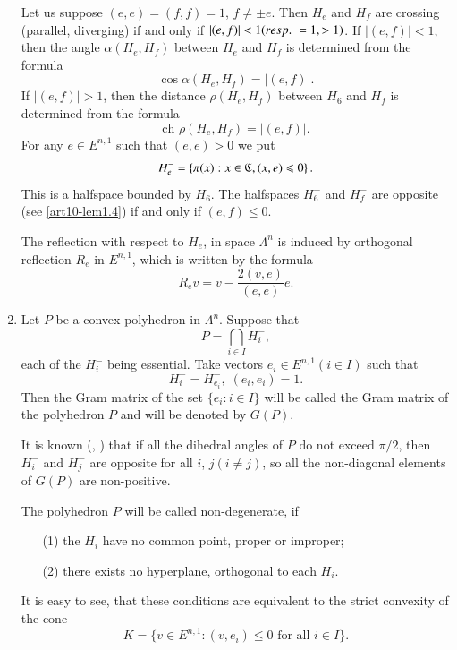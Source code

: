 \begin{enumerate}
Let us suppose $(e,e) = (f,f) = 1$, $f \neq \pm e$. Then $H_e$ and $H_f$ are crossing (\resp parallel, diverging) if and only if $|(e,f)| < 1 ({resp.}\kern.3em = 1, > 1)$. If $|(e,f)| <1$, then the angle $\alpha (H_e, H_f)$ between $H_e$ and $H_f$ is determined from the formula
$$
\cos \alpha (H_e, H_f) = |(e,f)|.
$$
If $|(e,f)| >1$, then the distance $\rho (H_e, H_f)$ between $H_6$ and $H_f$ is determined from the formula
$$
\text{ch } \rho (H_e, H_f) = |(e,f)|.
$$
For any $e \in E^{n,1}$ such that $(e,e) > 0$ we put 
\begin{equation}
H^-_e = \left\{\pi (x) : x \in \mathfrak{C}, (x,e) \leqslant 0 \right\}. \label{art10-eq2.3}
\end{equation}\pageoriginale 
This is a halfspace bounded by $H_6$. The halfspaces $H^-_6$ and $H^-_f$ are opposite (see \ref{art10-lem1.4}) if and only if $(e,f) \leqslant 0$.

The reflection with respect to $H_e$, in space $\Lambda^n$ is induced by orthogonal reflection $R_e$ in $E^{n,1}$, which is written by the formula
\begin{equation}
R_e v = v - \frac{2(v,e)}{(e,e)} e.  \label{art10-eq2.4}
\end{equation}

\item Let $P$ be a convex polyhedron in $\Lambda^n$. Suppose that 
\begin{equation}
P = \bigcap\limits_{i \in I} H^-_i,  \label{art10-eq2.5}
\end{equation}
each of the $H^-_i$ being essential. Take vectors $e_i \in E^{n,1} (i\in I)$ such that 
$$
H^-_i = H^-_{e_i}, \; (e_i, e_i) = 1.
$$
Then the Gram matrix of the set $\{e_i : i \in I\}$ will be called the Gram matrix of the polyhedron $P$ and will be denoted by $G(P)$.

It is known (\cite{art10-key9}, \cite{art10-key12}) that if all the dihedral angles of $P$ do not exceed $\pi/2$, then $H^-_i$ and $H^-_j$ are opposite for all $i$, $j (i \neq j)$, so all the non-diagonal elements of $G(P)$ are non-positive.

The polyhedron $P$ will be called non-degenerate, if 
\begin{itemize}
\item[(1)] the $H_i$ have no common point, proper or improper;

\item[(2)] there exists no hyperplane, orthogonal to each $H_i$.
\end{itemize}

It is easy to see, that these conditions are equivalent to the strict convexity of the cone
$$
K = \{v \in E^{n,1}: (v, e_i) \leqslant 0 \text{ for all } i \in I\}.
$$


\end{enumerate}
